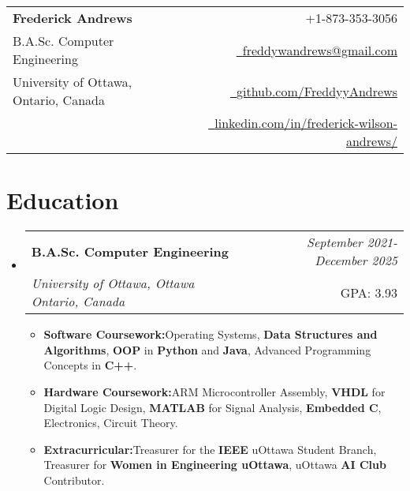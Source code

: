 \documentclass[a4paper,11pt]{article}
\makeatletter
\newcommand{\resumeItem}[2]{
  \item{
    \textbf{#1}{\hspace{0.5mm}#2 \vspace{-0.5mm}}
  }
}
\newcommand{\resumeSubheading}[4]{
\vspace{0.5mm}\item
    \begin{tabular*}{0.98\textwidth}[t]{l@{\extracolsep{\fill}}r}
        \textbf{#1} & \textit{\footnotesize{#4}} \\
        \textit{\footnotesize{#3}} &  \footnotesize{#2}\\
    \end{tabular*}
    \vspace{-2.4mm}
}
\newcommand{\resumeSubHeadingListStart}{\begin{itemize}[leftmargin=*,labelsep=0mm]}
\newcommand{\resumeItemListStart}{\begin{justify}\begin{itemize}[label=\textcolor{black}{--}, leftmargin=3ex, rightmargin=2ex, noitemsep,labelsep=1.2mm,itemsep=0mm]\small}
\newcommand{\resumeSubHeadingListEnd}{\end{itemize}\vspace{2mm}}
\newcommand{\resumeItemListEnd}{\end{itemize}\end{justify}\vspace{-2mm}}
\newcommand{\name}{Frederick Andrews} %
\newcommand{\phone}{873-353-3056} %
\newcommand{\emaila}{freddywandrews@gmail.com} %
\makeatother
\begin{document}
\selectfont
{}

\setlength{\footskip}{5pt}



{
\begin{tabularx}{\linewidth}{L r} \\
  \textbf{\Large \name} & {\raisebox{0.0\height}{\footnotesize \faPhone}\ +1-\phone}\\
  B.A.Sc. Computer Engineering  & \href{mailto:\emaila}{\raisebox{0.0\height}{\footnotesize \faEnvelope}\ {\emaila}} \\
  {University of Ottawa, Ontario, Canada}& \href{https://github.com/FreddyyAndrews}{\raisebox{0.0\height}{\footnotesize \faGithub}\ {github.com/FreddyyAndrews}} \\  
& \href{https://www.linkedin.com/in/frederick-wilson-andrews/}{\raisebox{0.0\height}{\footnotesize \faLinkedin}\ {linkedin.com/in/frederick-wilson-andrews/}}
\end{tabularx}
}
\vspace{-8mm}

\section{\textbf{Education}}
  \resumeSubHeadingListStart
    \resumeSubheading
      {B.A.Sc. Computer Engineering}{GPA: 3.93}
      {University of Ottawa, Ottawa Ontario, Canada}{September 2021- December 2025}
      \resumeItemListStart
      \vspace{1.0mm}
        \resumeItem{Software Coursework:}
          {Operating Systems, \textbf{Data Structures and Algorithms}, \textbf{OOP} in \textbf{Python} and \textbf{Java}, Advanced Programming Concepts in \textbf{C++}.}
          \vspace{1.0mm}
          \resumeItem{Hardware Coursework:}
          {ARM Microcontroller Assembly, \textbf{VHDL} for Digital Logic Design, \textbf{MATLAB} for Signal Analysis, \textbf{Embedded C}, Electronics, Circuit Theory.}
          \vspace{1.0mm}
          \resumeItem{Extracurricular:}
          {Treasurer for the \textbf{IEEE} uOttawa Student Branch, Treasurer for \textbf{Women in Engineering uOttawa}, uOttawa \textbf{AI Club} Contributor.}
      \resumeItemListEnd
  \resumeSubHeadingListEnd
\vspace{-8mm}
%
\end{document}
